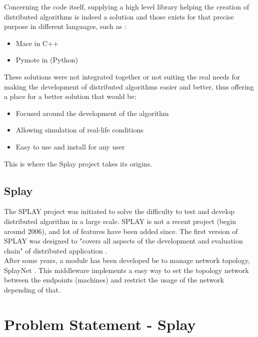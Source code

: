\documentclass{eplmastersthesis}
\begin{document}
      Concerning the code itself, supplying a high level library helping the
      creation of distributed algorithms is indeed a solution and those
      exists for that precise purpose in different languages, such as :

      \begin{itemize}
        \item Mace \cite{Mace} in C++
        \item Pymote \cite{Pymote} in (Python)
      \end{itemize}

      These solutions were not integrated together or not suiting the real needs
      for making the development of distributed algorithms easier and better,
      thus offering a place for a better solution that would be:

      \begin{itemize}
        \item Focused around the development of the algorithm
        \item Allowing simulation of real-life conditions
        \item Easy to use and install for any user
      \end{itemize}

      This is where the Splay project takes its origins.

    \section{Splay}

      The SPLAY project was initiated to solve the difficulty to test and
      develop distributed algorithm in a large scale. SPLAY is not a recent
      project (begin around 2006), and lot of features have been added since.
      The first version of SPLAY was designed to "covers all aspects of the
      development and evaluation chain" of distributed application
      \cite{SPLAY}. \\

      After some years, a module has been developed be to manage network
      topology, SplayNet \cite{SplayNet}. This middleware implements a easy
      way to set the topology network between the endpoints (machines) and
      restrict the usage of the network depending of that.


  \chapter{Problem Statement - Splay}
\end{document}
